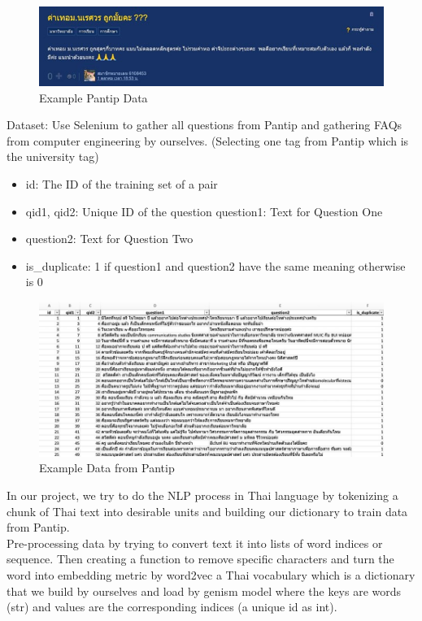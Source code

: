 \documentclass[12pt,oneside,openright,a4paper]{cpe-english-project}
\begin{document}
\begin{figure}[!h]
	\includegraphics[width=14cm]{img/ch3/Example Pantip Data.jpg}
	\caption{Example Pantip Data}\label{fig:Example Pantip Data}
\end{figure}

\begin{flushleft}
Dataset: Use Selenium to gather all questions from Pantip and gathering FAQs from computer engineering by ourselves. (Selecting one tag from Pantip which is the university tag)
\end{flushleft}

\begin{itemize}
  \item id: The ID of the training set of a pair 
  \item qid1, qid2: Unique ID of the question question1: Text for Question One
  \item question2: Text for Question Two
  \item is\_duplicate: 1 if question1 and question2 have the same meaning otherwise is 0
\end{itemize}

\begin{figure}[!h]
	\includegraphics[width=14cm]{img/ch3/Example Data from Pantip.jpg}
	\caption{Example Data from Pantip}\label{fig:Example Data from Pantip}
\end{figure}

\begin{flushleft}
In our project, we try to do the NLP process in Thai language by tokenizing a chunk of Thai text into desirable units and building our dictionary to train data from Pantip.\\
Pre-processing data by trying to convert text it into lists of word indices or sequence. Then creating a function to remove specific characters and turn the word into embedding metric by word2vec a Thai vocabulary which is a dictionary that we build by ourselves and load by genism model where the keys are words (str) and values are the corresponding indices (a unique id as int).
\end{flushleft}
\end{document}
